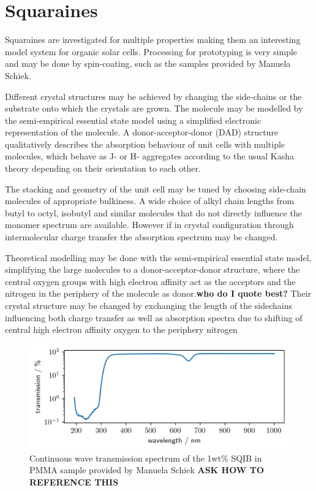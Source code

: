 \documentclass[twoside,openright]{scrreprt}
\begin{document}
\section{Squaraines}
Squaraines are investigated for multiple properties making them an interesting model system for organic solar cells. Processing for prototyping is very simple and may be done by spin-coating, such as the samples provided by Manuela Schiek. 

Different crystal structures may be achieved by changing the side-chains or the substrate onto which the crystals are grown. The molecule may be modelled by the semi-empirical essential state model using a simplified electronic representation of the molecule. A donor-acceptor-donor (DAD) structure qualitatively describes the absorption behaviour of unit cells with multiple molecules, which behave as J- or H- aggregates according to the usual Kasha theory depending on their orientation to each other.\cite{Hestand2015}

The stacking and geometry of the unit cell may be tuned by choosing side-chain molecules of appropriate bulkiness. A wide choice of alkyl chain lengths from butyl to octyl, isobutyl and similar molecules that do not directly influence the monomer spectrum are available. However if in crystal configuration through intermolecular charge transfer the absorption spectrum may be changed. \cite{Hestand2015, Brueck2014, Balzer2022}

Theoretical modelling may be done with the semi-empirical essential state model, simplifying the large molecules to a donor-acceptor-donor structure, where the central oxygen groups with high electron affinity act as the acceptors and the nitrogen in the periphery of the molecule as donor.\textbf{who do I quote best?\cite{Zhong2019}} Their crystal structure may be changed by exchanging the length of the sidechains influencing both charge transfer as well as absorption spectra due to shifting of central high electron affinity oxygen to the periphery nitrogen
\begin{figure}[hbtp]
\centering
\includegraphics[width = \textwidth]{images/SQIB1percentInPMMA_transmission.png}
\caption{Continuous wave transmission spectrum of the 1wt\% SQIB in PMMA sample provided by Manuela Schiek \textbf{ASK HOW TO REFERENCE THIS}}
\end{figure}
\end{document}
